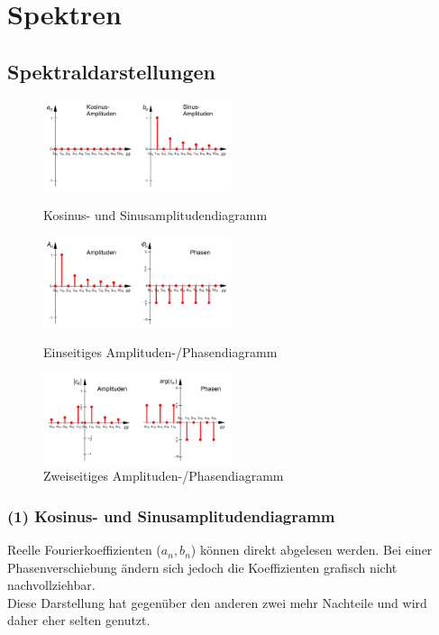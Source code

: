 \section{Spektren}
\subsection{Spektraldarstellungen}

\begin{figure}[htbp]
  \centering
  \begin{minipage}[b]{5.5cm}
    \includegraphics[width=5.5cm]{./bilder/spektren_cossin.png}
    \caption{Kosinus- und Sinusamplitudendiagramm} 
  \end{minipage}
  \hspace{1cm}
  \begin{minipage}[b]{5.5cm}
    \includegraphics[width=5.5cm]{./bilder/spektren_einseitig.png} 
    \caption{Einseitiges Amplituden-/Phasendiagramm} 
  \end{minipage}
  \hspace{1cm}
  \begin{minipage}[b]{5.5cm}
    \includegraphics[width=5.5cm]{./bilder/spektren_zweiseitig.png} 
    \caption{Zweiseitiges Amplituden-/Phasendiagramm} 
  \end{minipage}
\end{figure}

\subsubsection{(1) Kosinus- und Sinusamplitudendiagramm} 
Reelle Fourierkoeffizienten ($a_n, b_n$) können direkt abgelesen werden. 
Bei einer Phasenverschiebung ändern sich jedoch die Koeffizienten grafisch nicht nachvollziehbar. \\
Diese Darstellung hat gegenüber den anderen zwei mehr Nachteile und wird daher eher selten genutzt.

